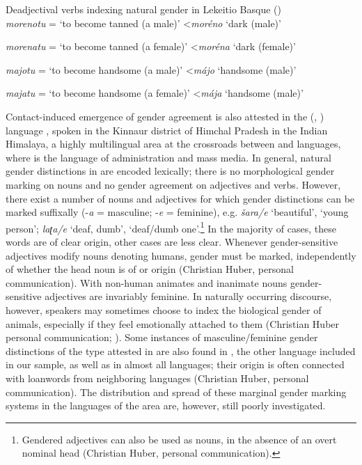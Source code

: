 \documentclass[output=collectionpaper]{langsci/langscibook}
\begin{document}
\ea\label{ex:dgm:9:Leikeitio}
Deadjectival verbs indexing natural gender in Lekeitio Basque (\citealt[109]{Hualde1994})\\
\textit{morenotu} = `to become tanned (a male)' \textless \textit{mor\'eno} `dark (male)'

\textit{morenatu} = `to become tanned (a female)' \textless \textit{mor\'ena} `dark (female)'

\textit{majotu} = `to become handsome (a male)' \textless \textit{m\'ajo} `handsome (male)'

\textit{majatu} = `to become handsome (a female)' \textless \textit{m\'aja} `handsome (male)'

\z




Contact-induced emergence of gender agreement is also attested in the  (, ) language , spoken in the Kinnaur district of Himchal Pradesh in the Indian Himalaya, a highly multilingual area at the crossroads between  and  languages, where  is the language of administration and mass media. In general, natural gender distinctions in  are encoded lexically; there is no morphological gender marking on nouns and no gender agreement on adjectives and verbs. However, there exist a number of nouns and adjectives for which gender distinctions can be marked suffixally (-\textit{a} = masculine; -\textit{e} = feminine), e.g. \textit{šara/e} `beautiful', `young person';  \textit{la{ʈ}a/e} `deaf, dumb', `deaf/dumb one'.\footnote{Gendered adjectives can also be used as nouns, in the absence of an overt nominal head (Christian Huber, personal communication).} In the majority of cases, these words are of clear  origin, other cases are less clear. Whenever gender-sensitive adjectives modify nouns denoting humans, gender must be marked, independently of whether the head noun is of  or  origin (Christian Huber, personal communication). With non-human animates and inanimate nouns gender-sensitive adjectives are invariably feminine. In naturally occurring discourse, however, speakers may sometimes choose to index the biological gender of animals, especially if they feel emotionally attached to them (Christian Huber personal communication; \citealt[76]{Huber2011}). Some instances of masculine/feminine gender distinctions of the type attested in  are also found in , the other  language included in our sample, as well as in almost all  languages; their origin is often connected with loanwords from neighboring  languages (Christian Huber, personal communication). The distribution and spread of these marginal gender marking systems in the languages of the area are, however, still poorly investigated.
\end{document}
